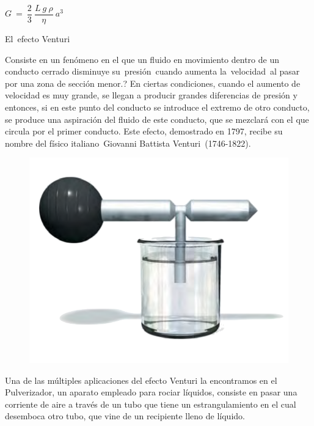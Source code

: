$G\ =\ \dfrac 2 3 \ \dfrac{L \ g \ \rho}{\eta} \ a^3$
\newpage
\begin{myblock}{El efecto Venturi}

Consiste en un fenómeno en el que un fluido en movimiento dentro de un conducto cerrado disminuye su presión cuando aumenta la velocidad al pasar por una zona de sección menor.? En ciertas condiciones, cuando el aumento de velocidad es muy grande, se llegan a producir grandes diferencias de presión y entonces, si en este punto del conducto se introduce el extremo de otro conducto, se produce una aspiración del fluido de este conducto, que se mezclará con el que circula por el primer conducto. Este efecto, demostrado en 1797, recibe su nombre del físico italiano Giovanni Battista Venturi (1746-1822).

\begin{figure}[H]
	\centering
	\includegraphics[width=.75\textwidth]{imagenes/imagenes18/T18IM10.png}
	\end{figure}

Una de las múltiples aplicaciones  del efecto Venturi la encontramos en el Pulverizador, un aparato empleado para rociar líquidos, consiste en pasar una corriente de aire a través de un tubo que tiene un estrangulamiento en el cual desemboca otro tubo, que vine de un recipiente lleno de líquido.	
\end{myblock}
